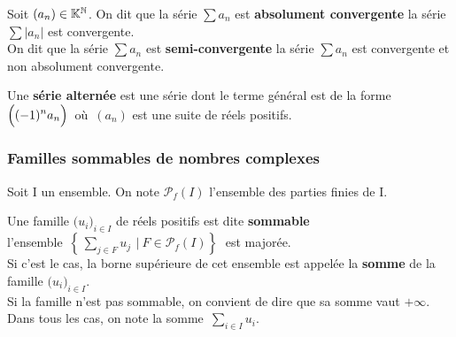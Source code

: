 \vspace{1.2cm}

Soit \((a_n)\in \mathbb{K}^{\mathbb{N}}\). On dit que la série \(\sum a_n\) est \textbf{absolument convergente} \ssi la série \(\sum |a_n|\) est convergente.\vspace{0.2cm}\\
On dit que la série \(\sum a_n\) est \textbf{semi-convergente} \ssi la série \(\sum a_n\) est convergente et non absolument convergente.

\vspace{1cm}

Une \textbf{série alternée} est une série dont le terme général est de la forme \(\displaystyle\Bigl((-1)^na_n\Bigr)\,\) où \(\,(a_n)\) est une suite de réels positifs.

\vspace{1.5cm}


\subsubsection{Familles sommables de nombres complexes}

\vspace{1cm}

\begin{center}
    Soit I un ensemble. On note \(\mathcal{P}_f(I)\) l'ensemble des parties finies de I.
\end{center}

\vspace{1.3cm}

Une famille \(\bigl(u_i\bigr)_{i\in I}\) de réels positifs est dite \textbf{sommable} \ssi\vspace*{0.1cm}\\
l'ensemble \(\,\displaystyle\left\{\,\sum_{j\in F}u_j \ \,| \ F\in \mathcal{P}_f(I)\right\}\;\) est majorée.\vspace{0.1cm}\\
Si c'est le cas, la borne supérieure de cet ensemble est appelée la \textbf{somme} de la famille \(\bigl(u_i\bigr)_{i\in I}\).\\
Si la famille n'est pas sommable, on convient de dire que sa somme vaut $+\infty$.\\
Dans tous les cas, on note la somme \(\,\underset{i\in I}{\sum}u_i.\)

